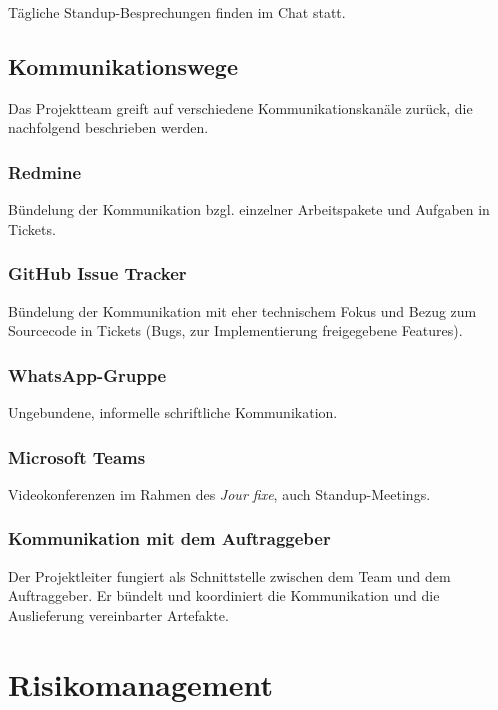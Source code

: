 \documentclass[a4paper,11pt,listof=numbered,glossary=totoc,parskip=half,toc=bib]{scrreprt}
\begin{document}
{Tägliche Standup-Besprechungen finden im Chat statt. 

\section{Kommunikationswege}

Das Projektteam greift auf verschiedene Kommunikationskanäle zurück, die nachfolgend beschrieben werden.

\subsection{Redmine}

Bündelung der Kommunikation bzgl. einzelner Arbeitspakete und Aufgaben in Tickets.

\subsection{GitHub Issue Tracker}

Bündelung der Kommunikation mit eher technischem Fokus und Bezug zum Sourcecode in Tickets (Bugs, zur Implementierung freigegebene Features).

\subsection{WhatsApp-Gruppe}

Ungebundene, informelle schriftliche Kommunikation.

\subsection{Microsoft Teams}

Videokonferenzen im Rahmen des \textit{Jour fixe}, auch Standup-Meetings.

\subsection{Kommunikation mit dem Auftraggeber}

Der Projektleiter fungiert als Schnittstelle zwischen dem Team und dem Auftraggeber. Er bündelt und koordiniert die Kommunikation und die Auslieferung vereinbarter Artefakte.

	\newpage
	\chapter{Risikomanagement}

}
\end{document}

